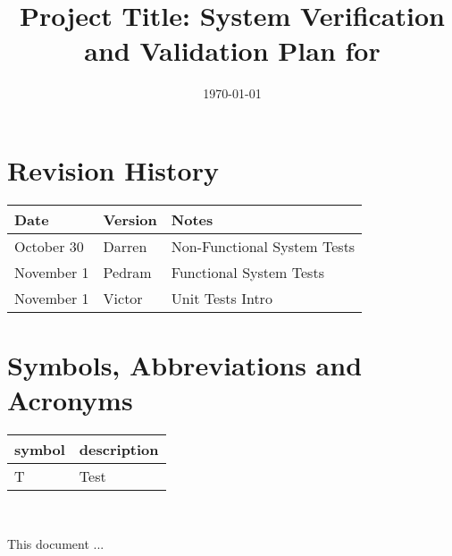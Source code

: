 \documentclass[12pt, titlepage]{article}
\begin{document}
\title{Project Title: System Verification and Validation Plan for \progname{}} 
\author{\authname}
\date{\today}
	
\maketitle


\section{Revision History}

\begin{tabularx}{\textwidth}{p{3cm}p{2cm}X}
\toprule {\bf Date} & {\bf Version} & {\bf Notes}\\
\midrule
October 30 & Darren & Non-Functional System Tests\\
November 1 & Pedram & Functional System Tests\\
November 1 & Victor & Unit Tests Intro\\
\bottomrule
\end{tabularx}

\newpage

\tableofcontents

\listoftables
{}

\listoffigures
{}

\newpage

\section{Symbols, Abbreviations and Acronyms}

\renewcommand{\arraystretch}{1.2}
\begin{tabular}{l l} 
  \toprule		
  \textbf{symbol} & \textbf{description}\\
  \midrule 
  T & Test\\
  \bottomrule
\end{tabular}\\


\newpage


This document ... 
\end{document}
